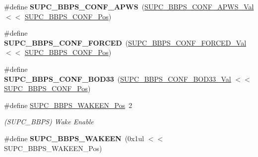 \begin{DoxyCompactItemize}
\item 
\hypertarget{group___s_a_m_l21___s_u_p_c_gaaa02039ae5d4297c3d03901157e8b9e1}{}\#define {\bfseries S\+U\+P\+C\+\_\+\+B\+B\+P\+S\+\_\+\+C\+O\+N\+F\+\_\+\+A\+P\+W\+S}~(\hyperlink{group___s_a_m_l21___s_u_p_c_ga6bfc9d1bbb05be9033ff1af9955cb306}{S\+U\+P\+C\+\_\+\+B\+B\+P\+S\+\_\+\+C\+O\+N\+F\+\_\+\+A\+P\+W\+S\+\_\+\+Val}       $<$$<$ \hyperlink{group___s_a_m_l21___s_u_p_c_gafb7f9d16c3342e20e279e40f0c5a8d06}{S\+U\+P\+C\+\_\+\+B\+B\+P\+S\+\_\+\+C\+O\+N\+F\+\_\+\+Pos})\label{group___s_a_m_l21___s_u_p_c_gaaa02039ae5d4297c3d03901157e8b9e1}

\item 
\hypertarget{group___s_a_m_l21___s_u_p_c_ga800bba14616d3ba6a693e0117ea3029d}{}\#define {\bfseries S\+U\+P\+C\+\_\+\+B\+B\+P\+S\+\_\+\+C\+O\+N\+F\+\_\+\+F\+O\+R\+C\+E\+D}~(\hyperlink{group___s_a_m_l21___s_u_p_c_ga3385481afbf71b502d4177f93c2925ea}{S\+U\+P\+C\+\_\+\+B\+B\+P\+S\+\_\+\+C\+O\+N\+F\+\_\+\+F\+O\+R\+C\+E\+D\+\_\+\+Val}     $<$$<$ \hyperlink{group___s_a_m_l21___s_u_p_c_gafb7f9d16c3342e20e279e40f0c5a8d06}{S\+U\+P\+C\+\_\+\+B\+B\+P\+S\+\_\+\+C\+O\+N\+F\+\_\+\+Pos})\label{group___s_a_m_l21___s_u_p_c_ga800bba14616d3ba6a693e0117ea3029d}

\item 
\hypertarget{group___s_a_m_l21___s_u_p_c_ga95a559d01ba2fc571a0b168874a76dd5}{}\#define {\bfseries S\+U\+P\+C\+\_\+\+B\+B\+P\+S\+\_\+\+C\+O\+N\+F\+\_\+\+B\+O\+D33}~(\hyperlink{group___s_a_m_l21___s_u_p_c_ga4829c246da4871a2e4901ab004043caa}{S\+U\+P\+C\+\_\+\+B\+B\+P\+S\+\_\+\+C\+O\+N\+F\+\_\+\+B\+O\+D33\+\_\+\+Val}      $<$$<$ \hyperlink{group___s_a_m_l21___s_u_p_c_gafb7f9d16c3342e20e279e40f0c5a8d06}{S\+U\+P\+C\+\_\+\+B\+B\+P\+S\+\_\+\+C\+O\+N\+F\+\_\+\+Pos})\label{group___s_a_m_l21___s_u_p_c_ga95a559d01ba2fc571a0b168874a76dd5}

\item 
\hypertarget{group___s_a_m_l21___s_u_p_c_ga9a04f5fce811216278d892056e995525}{}\#define \hyperlink{group___s_a_m_l21___s_u_p_c_ga9a04f5fce811216278d892056e995525}{S\+U\+P\+C\+\_\+\+B\+B\+P\+S\+\_\+\+W\+A\+K\+E\+E\+N\+\_\+\+Pos}~2\label{group___s_a_m_l21___s_u_p_c_ga9a04f5fce811216278d892056e995525}

\begin{DoxyCompactList}\small\item\em (S\+U\+P\+C\+\_\+\+B\+B\+P\+S) Wake Enable \end{DoxyCompactList}\item 
\hypertarget{group___s_a_m_l21___s_u_p_c_ga45d41d542fa35ecfde05f072420a392e}{}\#define {\bfseries S\+U\+P\+C\+\_\+\+B\+B\+P\+S\+\_\+\+W\+A\+K\+E\+E\+N}~(0x1ul $<$$<$ S\+U\+P\+C\+\_\+\+B\+B\+P\+S\+\_\+\+W\+A\+K\+E\+E\+N\+\_\+\+Pos)\label{group___s_a_m_l21___s_u_p_c_ga45d41d542fa35ecfde05f072420a392e}


\end{DoxyCompactItemize}
